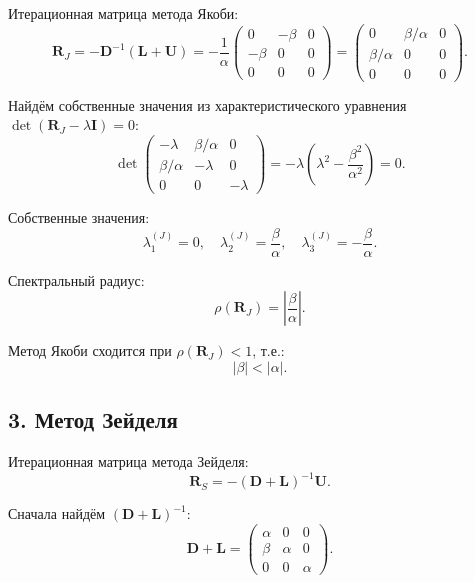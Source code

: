 \documentclass{article}
\begin{document}
Итерационная матрица метода Якоби:
\begin{equation}
\mathbf{R}_J = -\mathbf{D}^{-1}(\mathbf{L} + \mathbf{U}) = -\frac{1}{\alpha} \begin{pmatrix} 0 & -\beta & 0 \\ -\beta & 0 & 0 \\ 0 & 0 & 0 \end{pmatrix} = \begin{pmatrix} 0 & \beta/\alpha & 0 \\ \beta/\alpha & 0 & 0 \\ 0 & 0 & 0 \end{pmatrix}.
\end{equation}

Найдём собственные значения из характеристического уравнения $\det(\mathbf{R}_J - \lambda \mathbf{I}) = 0$:
\begin{equation}
\det \begin{pmatrix} -\lambda & \beta/\alpha & 0 \\ \beta/\alpha & -\lambda & 0 \\ 0 & 0 & -\lambda \end{pmatrix} = -\lambda \left(\lambda^2 - \frac{\beta^2}{\alpha^2}\right) = 0.
\end{equation}

Собственные значения:
\begin{equation}
\lambda_1^{(J)} = 0, \quad \lambda_2^{(J)} = \frac{\beta}{\alpha}, \quad \lambda_3^{(J)} = -\frac{\beta}{\alpha}.
\end{equation}

Спектральный радиус:
\begin{equation}
\rho(\mathbf{R}_J) = \left|\frac{\beta}{\alpha}\right|.
\end{equation}

Метод Якоби сходится при $\rho(\mathbf{R}_J) < 1$, т.е.:
\begin{equation}
\boxed{|\beta| < |\alpha|.}
\end{equation}

\subsection*{3. Метод Зейделя}

Итерационная матрица метода Зейделя:
\begin{equation}
\mathbf{R}_S = -(\mathbf{D} + \mathbf{L})^{-1} \mathbf{U}.
\end{equation}

Сначала найдём $(\mathbf{D} + \mathbf{L})^{-1}$:
\begin{equation}
\mathbf{D} + \mathbf{L} = \begin{pmatrix} \alpha & 0 & 0 \\ \beta & \alpha & 0 \\ 0 & 0 & \alpha \end{pmatrix}.
\end{equation}
\end{document}
